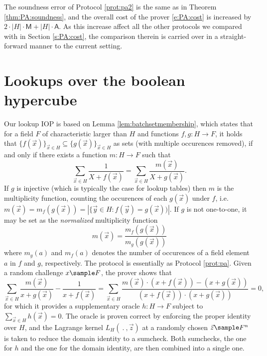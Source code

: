 \documentclass[11pt]{article}
\theoremstyle{definition}
\theoremstyle{remark}
\begin{document}
The soundness error of Protocol \ref{prot:pa2} is the same as in Theorem \ref{thm:PA:soundness}, and the overall cost of the prover \eqref{e:PA:cost} is increased by $2\cdot |H|\cdot\mathsf M + |H|\cdot\mathsf A$.
As this increase affect all the other protocols we compared with in Section \ref{s:PA:cost}, the comparison therein is carried over in a straight-forward manner to the current setting.

\section{Lookups over the boolean hypercube}

%
%
Our lookup IOP is based on Lemma \ref{lem:batchsetmembership}, which states that for a field $F$ of characteristic larger than $H$ and functions $f, g: H\rightarrow F$, it holds that $\{f(\vec x)\}_{\vec x\in H}\subseteq \{g(\vec x)\}_{\vec x\in H}$ as sets (with multiple occurences removed), if and only if there exists a function $m: H\rightarrow F$ such that
\[
\sum_{\vec x\in H} \frac{1}{X + f(\vec x)} = \sum_{\vec x\in H} \frac{m(\vec x)}{X + g(\vec x)}.
\]
If $g$ is injective (which is typically the case for lookup tables) then $m$ is the multiplicity function, counting the occurences of each $g(\vec x)$ under $f$, i.e.
$m(\vec x) = m_f(g(\vec x)) = |\{\vec y \in H: f(\vec y) = g(\vec x))|$.
If $g$ is not one-to-one, it may be set as the \textit{normalized} multiplicity function 
\begin{equation}
\label{e:lookup:m}
m(\vec x) = 
\frac{m_f(g(\vec x))}{m_g(g(\vec x))} %
\end{equation}
where $m_g(a)$ and $m_{f}(a)$ denotes the number of occurences of a field element $a$ in $f$ and  $g$, respectively.
The protocol is essentially as Protocol \ref{prot:pa}.
Given a random challenge $x\sample F$, the prover shows that
\[
\sum_{\vec x\in H} \frac{m(\vec x)}{x + g(\vec x)} - \frac{1}{x + f(\vec x)} 
= \sum_{\vec x\in H} \frac{ m(\vec x)\cdot (x + f(\vec x)) - (x + g(\vec x))}{(x + f(\vec x))\cdot (x + g(\vec x))} 
= 0,
\]
for which it provides a supplementary oracle $h: H\rightarrow F$ subject to $\sum_{\vec x\in H} h(\vec x) = 0$.
The oracle is proven correct by enforcing the proper identity over $H$, and the Lagrange kernel $L_H(\:.\:, \vec z)$ at a randomly chosen $\vec z\sample F^n$ is taken to reduce the domain identity to a sumcheck. 
Both sumchecks, the one for $h$ and the one for the domain identity, are then combined into a single one.
\end{document}
